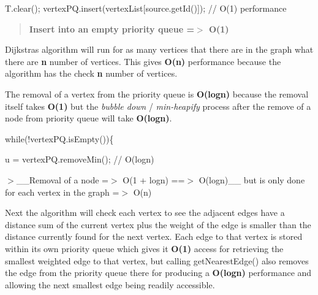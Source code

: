 \begin{DoxyCode}
T.clear();
vertexPQ.insert(vertexList[source.getId()]);    \textcolor{comment}{// O(1) performance}
\end{DoxyCode}


\begin{quote}
{\bfseries Insert into an empty priority queue =$>$ O(1)} \end{quote}


Dijkstra\textquotesingle{}s algorithm will run for as many vertices that there are in the graph what there are {\bfseries n} number of vertices. This gives {\bfseries O(n)} performance because the algorithm has the check {\bfseries n} number of vertices.

The removal of a vertex from the priority queue is {\bfseries O(logn)} because the removal itself takes {\bfseries O(1)} but the {\itshape bubble down} / {\itshape min-\/heapify} process after the remove of a node from priority queue will take {\bfseries O(logn)}.


\begin{DoxyCode}
\textcolor{keywordflow}{while}(!vertexPQ.isEmpty())\{

    u = vertexPQ.removeMin();   \textcolor{comment}{// O(logn)}
\end{DoxyCode}


$>$\+\_\+\+\_\+\+Removal of a node =$>$ O(1 + logn) ==$>$ O(logn)\+\_\+\+\_\+ but is only done for each vertex in the graph =$>$ O(n)

Next the algorithm will check each vertex to see the adjacent edges have a distance sum of the current vertex plus the weight of the edge is smaller than the distance currently found for the next vertex. Each edge to that vertex is stored within its own priority queue which gives it {\bfseries O(1)} access for retrieving the smallest weighted edge to that vertex, but calling {\ttfamily get\+Nearest\+Edge()} also removes the edge from the priority queue there for producing a {\bfseries O(logn)} performance and allowing the next smallest edge being readily accessible.


